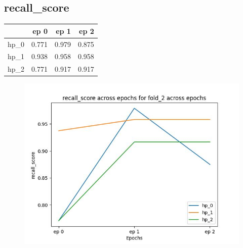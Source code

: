 \documentclass{article}
\begin{document}
\subsection{recall\_score}
\begin{tabular}{lrrr}
\toprule
{} &   ep 0 &   ep 1 &   ep 2 \\
\midrule
hp\_0 &  0.771 &  0.979 &  0.875 \\
hp\_1 &  0.938 &  0.958 &  0.958 \\
hp\_2 &  0.771 &  0.917 &  0.917 \\
\bottomrule
\end{tabular}

\begin{figure}[H]
\includegraphics[scale = 0.75]{fold_2/recall_score}
\end{figure}
\end{document}
